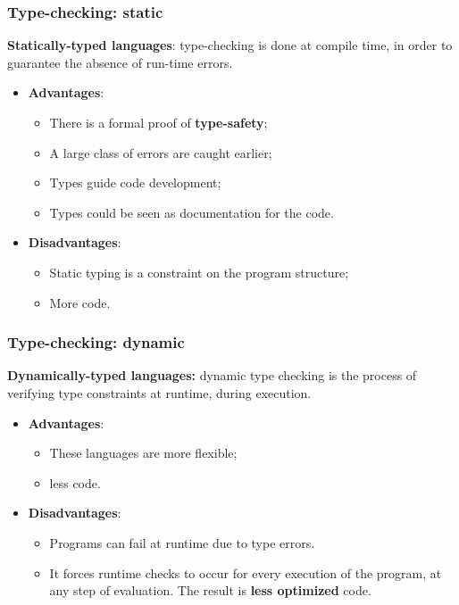 \documentclass[xcolor ={table,usenames,dvipsnames}]{beamer}
\theoremstyle{definition}
\begin{document}
	\begin{frame}
		\frametitle{Type-checking: static  }
		\textbf{Statically-typed languages}: type-checking is done at
		compile time, in order to guarantee the absence of run-time errors.
		\begin{itemize}
			\item \textbf{Advantages}:\begin{itemize}
				\item There is a formal proof of \textbf{type-safety};
				\item A large class of errors are caught earlier;
				\item Types guide code development;
				\item Types could be seen as documentation for the code.
			\end{itemize}
			\item \textbf{Disadvantages}: 
			\begin{itemize}
				\item Static typing is a constraint on the program structure;
				\item More code.
			\end{itemize}
		
		\end{itemize}
	\end{frame}

\begin{frame}
	\frametitle{Type-checking: dynamic}
	\textbf{Dynamically-typed languages:} dynamic
	type checking is the process of verifying type constraints at runtime,
	during execution.
	\begin{itemize}
		\item \textbf{Advantages}:
		\begin{itemize}
			\item These languages are more flexible;
			\item less code.
		\end{itemize}
		\item \textbf{Disadvantages}:
		\begin{itemize}
			\item Programs can fail at runtime due to type errors.
			\item It forces runtime checks to occur for every execution of the program, at any step of evaluation. The result is \textbf{less optimized} code.
		\end{itemize}
	\end{itemize}
 \end{frame}
\end{document}
